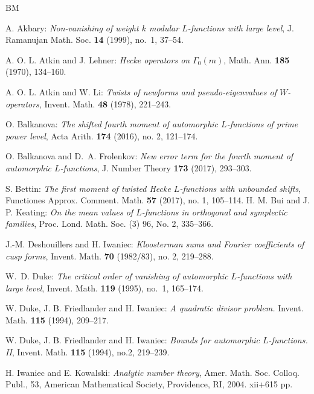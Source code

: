 \documentclass[12pt]{amsart}
\theoremstyle{plain}
\theoremstyle{definition}
\begin{document}

\begin{thebibliography}{BM}



A. Akbary: \emph{Non-vanishing of weight $k$ modular $L$-functions with large level}, J. Ramanujan Math. Soc. {\bf 14} (1999), no.~1, 37--54.

A. O. L. Atkin and J. Lehner: \emph{Hecke operators on $\Gamma_0(m)$}, Math. Ann. {\bf 185} (1970), 134--160.

A. O. L. Atkin and W. Li:    \emph {Twists of newforms and pseudo-eigenvalues of {$W$}-operators},
   Invent. Math. {\bf 48} (1978), 221--243.
   
O. Balkanova: \emph{The shifted fourth moment of automorphic $L$-functions of prime power level}, Acta Arith. {\bf 174} (2016), no. 2, 121--174.

O. Balkanova and D.~A. Frolenkov: \emph{New error term for the fourth moment of automorphic $L$-functions}, J. Number Theory {\bf 173} (2017), 293--303.

S. Bettin: \emph{The first moment of twisted Hecke $L$-functions with unbounded shifts}, Functiones Approx. Comment. Math. {\bf 57} (2017), no. 1, 105--114.
H. M. Bui and J. P. Keating: \emph{On the mean values of $L$-functions in orthogonal and symplectic families}, Proc. Lond. Math. Soc. (3) 96, No. 2, 335--366.



J.-M. Deshouillers and H. Iwaniec: \emph{Kloosterman sums and Fourier coefficients of cusp forms}, Invent. Math. {\bf 70} (1982/83), no. 2, 219--288. 

W.~D. Duke: \emph{The critical order of vanishing of automorphic $L$-functions with large level}, Invent. Math. {\bf 119} (1995), no.~1, 165--174.

W. Duke, J. B. Friedlander and H. Iwaniec: \emph{A quadratic divisor problem.} Invent. Math. {\bf 115} (1994), 209--217.

W. Duke, J. B. Friedlander and H. Iwaniec: \emph{Bounds for automorphic $L$-functions. II}, Invent. Math. {\bf 115} (1994), no.2, 219--239.

H. Iwaniec and E. Kowalski: \emph{Analytic number theory}, Amer. Math. Soc. Colloq. Publ., 53, American Mathematical Society, Providence, RI, 2004. xii+615 pp.



\end{thebibliography}
\end{document}
